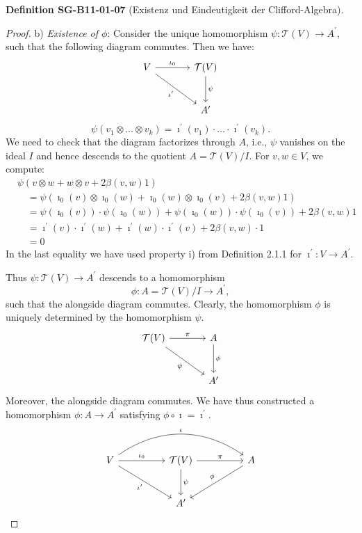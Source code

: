 \documentclass[10pt, letterpaper]{article}
\newcommand{\CustomHeading}[3]{%
  \par\medskip\noindent%
  \textbf{#1 #2} \textnormal{(#3)}.\enskip%
}
\newenvironment{DEF}[2]{\begin{unitbox}\CustomHeading{Definition}{#1}{#2}}{\end{unitbox}}
\begin{document}
\begin{DEF}{SG-B11-01-07}{Existenz und Eindeutigkeit der Clifford-Algebra}
\begin{proof}
b) \emph{Existence of $\phi$}: Consider the unique homomorphism $\psi: \mathcal{T}(V) \rightarrow A^{\prime}$, such that the following diagram commutes. Then we have:\\
\[
\begin{tikzcd}[row sep=large, column sep=large]
V \arrow[r, "\iota_0"] \arrow[dr, "\iota'"'] & \mathcal{T}(V) \arrow[d, "\psi"] \\
& A'
\end{tikzcd}
\]
$$
\psi\left(v_{1} \otimes \ldots \otimes v_{k}\right)=\imath^{\prime}\left(v_{1}\right) \cdot \ldots \cdot \imath^{\prime}\left(v_{k}\right) .
$$
We need to check that the diagram factorizes through $A$, i.e., $\psi$ vanishes on the ideal $I$ and hence descends to the quotient $A=\mathcal{T}(V) / I$. For $v, w \in V$, we compute:
$$
\begin{aligned}
& \psi(v \otimes w+w \otimes v+2 \beta(v, w) 1) \\
& \quad=\psi\left(\imath_{0}(v) \otimes \imath_{0}(w)+\imath_{0}(w) \otimes \imath_{0}(v)+2 \beta(v, w) 1\right) \\
& \quad=\psi\left(\imath_{0}(v)\right) \cdot \psi\left(\imath_{0}(w)\right)+\psi\left(\imath_{0}(w)\right) \cdot \psi\left(\imath_{0}(v)\right)+2 \beta(v, w) 1 \\
& \quad=\imath^{\prime}(v) \cdot \imath^{\prime}(w)+\imath^{\prime}(w) \cdot \imath^{\prime}(v)+2 \beta(v, w) \cdot 1 \\
& \quad=0
\end{aligned}
$$
In the last equality we have used property i) from Definition 2.1.1 for $\imath^{\prime}: V \rightarrow A^{\prime}$.

Thus $\psi: \mathcal{T}(V) \rightarrow A^{\prime}$ descends to a homomorphism
$$
\phi: A=\mathcal{T}(V) / I \rightarrow A^{\prime},
$$
such that the alongside diagram commutes. Clearly, the homomorphism $\phi$ is uniquely determined by the homomorphism $\psi$.
\[
\begin{tikzcd}[row sep=large, column sep=large]
\mathcal{T}(V) \arrow[r, "\pi"] \arrow[dr, "\psi"'] & A \arrow[d, "\phi"] \\
& A'
\end{tikzcd}
\]
Moreover, the alongside diagram commutes. We have thus constructed a homomorphism $\phi: A \rightarrow A^{\prime}$ satisfying $\phi \circ \imath=\imath^{\prime}$.
\[
\begin{tikzcd}[row sep=large, column sep=huge]
V
  & \mathcal{T}(V) \arrow[d, "\psi"]
  & A 
\\
{} & A' & {}
%
\arrow[from=1-1, to=1-2, "\iota_0"]               %
\arrow[from=1-2, to=1-3, "\pi"]               %
\arrow[from=1-1, to=2-2, "\iota'"']               %
\arrow[from=1-3, to=2-2, "\phi"']             %
\arrow[from=1-1, to=1-3, bend left=35, "\iota"]   %
\end{tikzcd}
\]
\end{proof}
\end{DEF}
\end{document}
